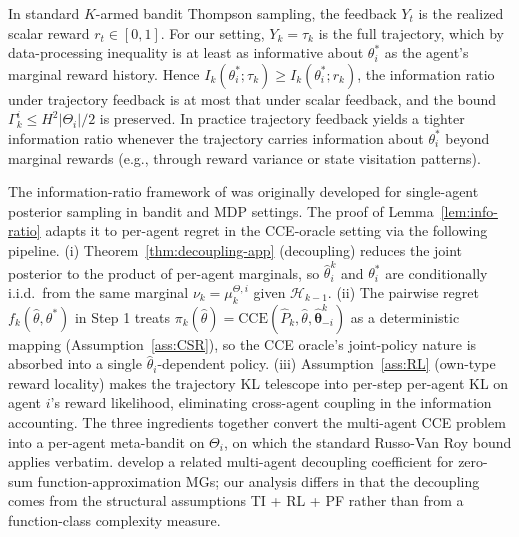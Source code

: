 \begin{remark}
\label{rem:traj-feedback}
In standard $K$-armed bandit Thompson sampling, the feedback $Y_t$ is the realized scalar reward $r_t \in [0, 1]$. For our setting, $Y_k = \tau_k$ is the full trajectory, which by data-processing inequality is at least as informative about $\theta_i^*$ as the agent's marginal reward history. Hence $I_k(\theta_i^*; \tau_k) \geq I_k(\theta_i^*; r_k)$, the information ratio under trajectory feedback is at most that under scalar feedback, and the bound $\Gamma_k^i \leq H^2 |\Theta_i|/2$ is preserved. In practice trajectory feedback yields a tighter information ratio whenever the trajectory carries information about $\theta_i^*$ beyond marginal rewards (e.g., through reward variance or state visitation patterns).
\end{remark}

\begin{remark}
\label{rem:multi-agent-cce}
The information-ratio framework of \citet{russo2016information} was originally developed for single-agent posterior sampling in bandit and MDP settings. The proof of Lemma~\ref{lem:info-ratio} adapts it to per-agent regret in the CCE-oracle setting via the following pipeline. (i) Theorem~\ref{thm:decoupling-app} (decoupling) reduces the joint posterior to the product of per-agent marginals, so $\hat\theta_i^k$ and $\theta_i^*$ are conditionally i.i.d.\ from the same marginal $\nu_k = \mu_k^{\Theta,i}$ given $\mathcal{H}_{k-1}$. (ii) The pairwise regret $f_k(\hat\theta, \theta^*)$ in Step 1 treats $\pi_k(\hat\theta) = \mathrm{CCE}(\hat P_k, \hat\theta, \hat{\boldsymbol\theta}_{-i}^k)$ as a deterministic mapping (Assumption~\ref{ass:CSR}), so the CCE oracle's joint-policy nature is absorbed into a single $\hat\theta_i$-dependent policy. (iii) Assumption~\ref{ass:RL} (own-type reward locality) makes the trajectory KL telescope into per-step per-agent KL on agent $i$'s reward likelihood, eliminating cross-agent coupling in the information accounting. The three ingredients together convert the multi-agent CCE problem into a per-agent meta-bandit on $\Theta_i$, on which the standard Russo-Van Roy bound applies verbatim. \citet{xiong2022self} develop a related multi-agent decoupling coefficient for zero-sum function-approximation MGs; our analysis differs in that the decoupling comes from the structural assumptions TI + RL + PF rather than from a function-class complexity measure.
\end{remark}


